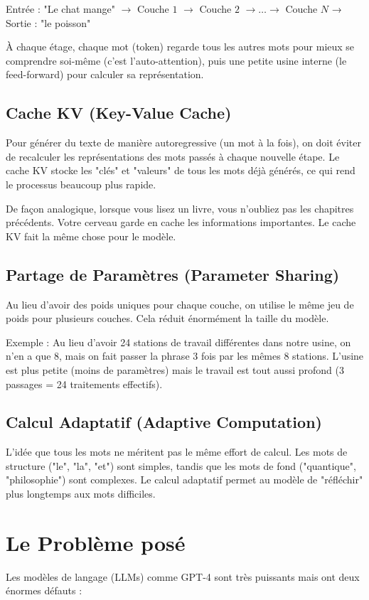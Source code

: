 \documentclass[a4paper]{article}
\begin{document}
Entrée : "Le chat mange" $\rightarrow$ Couche $1$ $\rightarrow$ Couche $2$
$\rightarrow \ldots \rightarrow $  Couche $N$ → Sortie : "le poisson"

À chaque étage, chaque mot (token) regarde tous les autres mots pour mieux
se comprendre soi-même (c'est l'auto-attention), puis une petite usine interne
(le feed-forward) pour calculer sa représentation.

\subsection{Cache KV (Key-Value Cache)}
Pour générer du texte de manière autoregressive (un mot à la fois),
on doit éviter de recalculer les représentations des mots passés
à chaque nouvelle étape. Le cache KV stocke les "clés" et "valeurs" de tous
les mots déjà générés, ce qui rend le processus beaucoup plus rapide.

De façon analogique, lorsque vous lisez un livre, vous n'oubliez
pas les chapitres précédents. Votre cerveau garde en cache les informations
importantes. Le cache KV fait la même chose pour le modèle.

\subsection{Partage de Paramètres (Parameter Sharing)}
Au lieu d'avoir des poids uniques pour chaque couche, on utilise le même jeu
de poids pour plusieurs couches. Cela réduit énormément la taille du modèle.

Exemple : Au lieu d'avoir 24 stations de travail différentes dans notre usine,
on n'en a que 8, mais on fait passer la phrase 3 fois par les mêmes 8 stations.
L'usine est plus petite (moins de paramètres) mais le travail est tout aussi
profond (3 passages = 24 traitements effectifs).

\subsection{Calcul Adaptatif (Adaptive Computation)}
L'idée que tous les mots ne méritent pas le même effort de calcul.
Les mots de structure ("le", "la", "et") sont simples, tandis que les mots
de fond ("quantique", "philosophie") sont complexes. Le calcul adaptatif
permet au modèle de "réfléchir" plus longtemps aux mots difficiles.

\section{Le Problème posé}
Les modèles de langage (LLMs) comme GPT-4 sont très puissants
mais ont deux énormes défauts :
\end{document}
